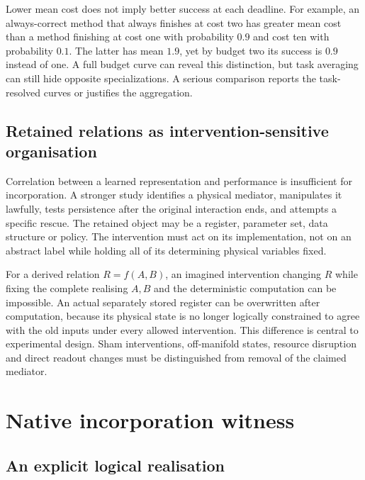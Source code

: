\documentclass[
  11pt,
  a4paper,
]{article}
\begin{document}
Lower mean cost does not imply better success at each deadline. For
example, an always-correct method that always finishes at cost two has
greater mean cost than a method finishing at cost one with probability
\(0.9\) and cost ten with probability \(0.1\). The latter has mean
\(1.9\), yet by budget two its success is \(0.9\) instead of one. A full
budget curve can reveal this distinction, but task averaging can still
hide opposite specializations. A serious comparison reports the
task-resolved curves or justifies the aggregation.

\subsection{Retained relations as intervention-sensitive
organisation}\label{retained-relations-as-intervention-sensitive-organization}

Correlation between a learned representation and performance is
insufficient for incorporation. A stronger study identifies a physical
mediator, manipulates it lawfully, tests persistence after the original
interaction ends, and attempts a specific rescue. The retained object
may be a register, parameter set, data structure or policy. The
intervention must act on its implementation, not on an abstract label
while holding all of its determining physical variables fixed.

For a derived relation \(R=f(A,B)\), an imagined intervention changing
\(R\) while fixing the complete realising \(A,B\) and the deterministic
computation can be impossible. An actual separately stored register can
be overwritten after computation, because its physical state is no
longer logically constrained to agree with the old inputs under every
allowed intervention. This difference is central to experimental design.
Sham interventions, off-manifold states, resource disruption and direct
readout changes must be distinguished from removal of the claimed
mediator.

\section{Native incorporation
witness}\label{native-incorporation-witness}

\subsection{An explicit logical
realisation}\label{an-explicit-logical-realization}
\end{document}
